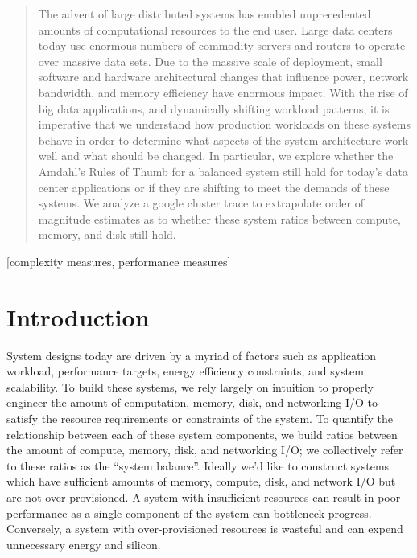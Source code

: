 \documentclass{sig-alternate}
\begin{document}
\maketitle
\begin{abstract}

The advent of large distributed systems has enabled unprecedented amounts of computational resources to the end user.
Large data centers today use enormous numbers of commodity servers and routers to operate over massive data sets.
Due to the massive scale of deployment, small software and hardware architectural changes that influence power, network bandwidth, and memory efficiency have enormous impact.
With the rise of big data applications, and dynamically shifting workload patterns, it is imperative that we understand how production workloads on these systems behave in order to determine what aspects of the system architecture work well and what should be changed.
In particular, we explore whether the Amdahl's Rules of Thumb for a balanced system still hold for today's data center applications or if they are shifting to meet the demands of these systems.
We analyze a google cluster trace to extrapolate order of magnitude estimates as to whether these system ratios between compute, memory, and disk still hold.

\end{abstract}

[complexity measures, performance measures]



\section{Introduction}

System designs today are driven by a myriad of factors such as application workload, performance targets, energy efficiency constraints, and system scalability.
To build these systems, we rely largely on intuition to properly engineer the amount of computation, memory, disk, and networking I/O to satisfy the resource requirements or constraints of the system.
To quantify the relationship between each of these system components, we build ratios between the amount of compute, memory, disk, and networking I/O; we collectively refer to these ratios as the ``system balance''.
Ideally we'd like to construct systems which have sufficient amounts of memory, compute, disk, and network I/O but are not over-provisioned.
A system with insufficient resources can result in poor performance as a single component of the system can bottleneck progress.
Conversely, a system with over-provisioned resources is wasteful and can expend unnecessary energy and silicon.
\end{document}
